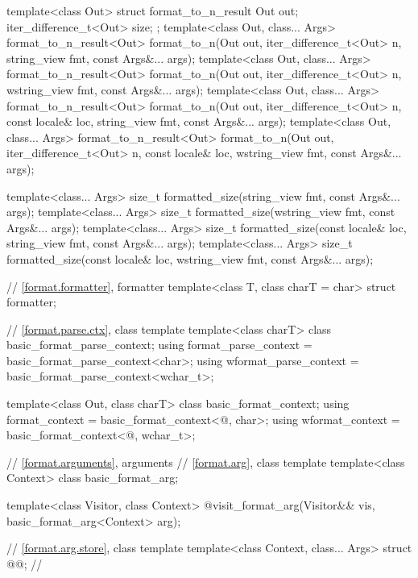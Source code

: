 \begin{codeblock}
{  template<class Out> struct format_to_n_result {
    Out out;
    iter_difference_t<Out> size;
  };
  template<class Out, class... Args>
    format_to_n_result<Out> format_to_n(Out out, iter_difference_t<Out> n,
                                        string_view fmt, const Args&... args);
  template<class Out, class... Args>
    format_to_n_result<Out> format_to_n(Out out, iter_difference_t<Out> n,
                                        wstring_view fmt, const Args&... args);
  template<class Out, class... Args>
    format_to_n_result<Out> format_to_n(Out out, iter_difference_t<Out> n,
                                        const locale& loc, string_view fmt,
                                        const Args&... args);
  template<class Out, class... Args>
    format_to_n_result<Out> format_to_n(Out out, iter_difference_t<Out> n,
                                        const locale& loc, wstring_view fmt,
                                        const Args&... args);

  template<class... Args>
    size_t formatted_size(string_view fmt, const Args&... args);
  template<class... Args>
    size_t formatted_size(wstring_view fmt, const Args&... args);
  template<class... Args>
    size_t formatted_size(const locale& loc, string_view fmt, const Args&... args);
  template<class... Args>
    size_t formatted_size(const locale& loc, wstring_view fmt, const Args&... args);

  // \ref{format.formatter}, formatter
  template<class T, class charT = char> struct formatter;

  // \ref{format.parse.ctx}, class template 
  template<class charT> class basic_format_parse_context;
  using format_parse_context = basic_format_parse_context<char>;
  using wformat_parse_context = basic_format_parse_context<wchar_t>;

  template<class Out, class charT> class basic_format_context;
  using format_context = basic_format_context<@\unspec@, char>;
  using wformat_context = basic_format_context<@\unspec@, wchar_t>;

  // \ref{format.arguments}, arguments
  // \ref{format.arg}, class template 
  template<class Context> class basic_format_arg;

  template<class Visitor, class Context>
    @\seebelow@ visit_format_arg(Visitor&& vis, basic_format_arg<Context> arg);

  // \ref{format.arg.store}, class template 
  template<class Context, class... Args> struct @@;      // \expos

}
\end{codeblock}
